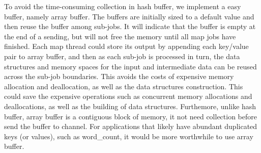 
To avoid the time-consuming collection in hash buffer, 
we implement a easy buffer, namely array buffer.
The buffers are initially sized to a default value and 
then reuse the buffer among sub-jobs.
It will indicate that the buffer is empty at the end of a sending, 
but will not free the memory until all map jobs have finished.
Each map thread could store its output 
by appending each key/value pair to array buffer, 
and then as each sub-job is processed in turn,
the data structures and memory spaces 
for the input and intermediate data can be reused across the sub-job boundaries. 
This avoids the costs of expensive memory allocation and deallocation, 
as well as the data structures construction.
This could save the expensive operations 
such as concurrent memory allocations and deallocations,
as well as the building of data structures.
Furthemore, unlike hash buffer, array buffer is a contiguous block of memory,
it not need collection before send the buffer to channel.
For applications that likely have abundant duplicated keys (or values),
such as word\_count, it would be more worthwhile to use array buffer.







